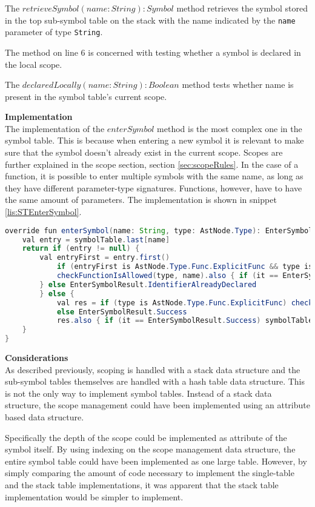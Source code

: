 The $retrieveSymbol(name: String): Symbol$ method retrieves the symbol stored in the top sub-symbol table on the stack with the name indicated by the \texttt{name} parameter of type \texttt{String}.

The method on line 6 is concerned with testing whether a symbol is declared in the local scope.

The $declaredLocally(name: String): Boolean$ method tests whether name is present in the symbol table's current scope.

\textbf{Implementation}\\
The implementation of the $enterSymbol$ method is the most complex one in the symbol table. 
This is because when entering a new symbol it is relevant to make sure that the symbol doesn't already exist in the current scope.
Scopes are further explained in the scope section, section \ref{sec:scopeRules}.
In the case of a function, it is possible to enter multiple symbols with the same name, as long as they have different parameter-type signatures. 
Functions, however, have to have the same amount of parameters.
The implementation is shown in snippet \ref{lis:STEnterSymbol}.

\begin{lstlisting}[language=java,label=lis:STEnterSymbol,caption=Implementation of enterSymbol.]
override fun enterSymbol(name: String, type: AstNode.Type): EnterSymbolResult {
	val entry = symbolTable.last[name]
	return if (entry != null) {
		val entryFirst = entry.first()
			if (entryFirst is AstNode.Type.Func.ExplicitFunc && type is AstNode.Type.Func.ExplicitFunc) {
			checkFunctionIsAllowed(type, name).also { if (it == EnterSymbolResult.Success) entry.add(type) }
		} else EnterSymbolResult.IdentifierAlreadyDeclared
		} else {
			val res = if (type is AstNode.Type.Func.ExplicitFunc) checkFunctionIsAllowed(type, name)
			else EnterSymbolResult.Success
			res.also { if (it == EnterSymbolResult.Success) symbolTable.last[name] = mutableListOf(type) }
	}
}
\end{lstlisting}

\textbf{Considerations}\\
As described previously, scoping is handled with a stack data structure and the sub-symbol tables themselves are handled with a hash table data structure.
This is not the only way to implement symbol tables.
Instead of a stack data structure, the scope management could have been implemented using an attribute based data structure.

Specifically the depth of the scope could be implemented as attribute of the symbol itself.
By using indexing on the scope management data structure, the entire symbol table could have been implemented as one large table.
However, by simply comparing the amount of code necessary to implement the single-table and the stack table implementations, it was apparent that the stack table implementation would be simpler to implement.

